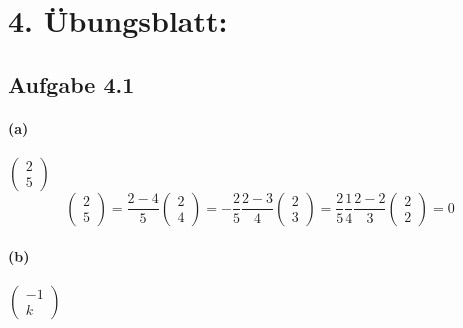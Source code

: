 \section{4. Übungsblatt:}

\subsection{Aufgabe 4.1}

\paragraph{(a)}
$\begin{pmatrix}
2\\
5
\end{pmatrix}$
\begin{equation*}
\begin{pmatrix}
2\\
5
\end{pmatrix}
=\frac{2-4}{5}
\begin{pmatrix}
2\\
4
\end{pmatrix}
=-\frac{2}{5}\frac{2-3}{4}
\begin{pmatrix}
2\\
3
\end{pmatrix}
=\frac{2}{5}\frac{1}{4}\frac{2-2}{3}
\begin{pmatrix}
2\\
2
\end{pmatrix}
=0
\end{equation*}

\paragraph{(b)}
$\begin{pmatrix}
-1\\
k
\end{pmatrix}$

